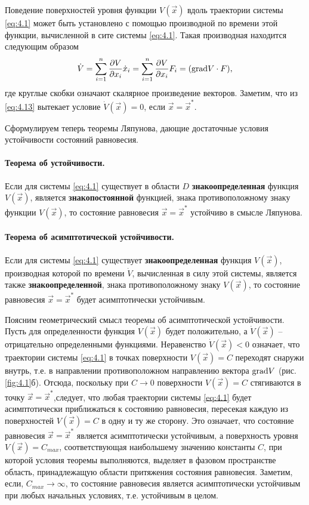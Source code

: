Поведение поверхностей уровня функции $V(\vec x)$ вдоль траектории системы \eqref{eq:4.1} может быть установлено с помощью производной по времени этой функции, вычисленной в сите системы \eqref{eq:4.1}. Такая производная находится следующим образом
\begin{equation}
        \label{eq:4.13}
        \dot V = \sum\limits_{i=1}^{n}  \pdv{V}{x_i} \dot x_{i} = \sum\limits_{i=1}^{n} \pdv{V}{x_{i}} F_i = 
        \qty( \textrm{grad} V \cdot F),
\end{equation}
где круглые скобки означают скалярное произведение векторов. Заметим, что из \eqref{eq:4.13} вытекает условие $\dot V(\vec x)=0$, если $\vec x = \vec x^*$.

Сформулируем теперь теоремы Ляпунова, дающие достаточные условия устойчивости состояний равновесия.

\paragraph{Теорема об устойчивости.}%
\label{par:teorema_ob_ustoichivosti_}

Если для системы \eqref{eq:4.1} существует в области $D$
\textbf{знакоопределенная} функция $V(\vec x)$, является \textbf{знакопостоянной} 
функцией, знака противоположному знаку функции $V(\vec x)$, то состояние равновесия $\vec x = \vec x^*$ устойчиво в смысле Ляпунова.

\paragraph{Теорема об асимптотической устойчивости.}%
\label{par:teorema_ob_asimptoticheskoi_ustoichivosti}

Если для системы \eqref{eq:4.1} существует \textbf{знакоопределенная} функция $V(\vec x)$, производная которой по времени $\dot V$, вычисленная в силу этой системы, является также \textbf{ знакоопределенной}, знака противоположному знаку $V(\vec x)$, то состояние равновесия $\vec x= \vec x^*$ будет асимптотически устойчивым. 

Поясним геометрический смысл теоремы об асимптотической устойчивости. Пусть для определенности функция $V(\vec x)$ будет положительно, а 
$\dot V(\vec x)$ -- отрицательно определенными функциями. Неравенство $\dot V(\vec x)<0$ означает, что траектории системы \eqref{eq:4.1} в точках поверхности $V(\vec x)= C$ переходят снаружи внутрь, т.е. в направлении противоположном направлению вектора $\textrm{grad} V$ (рис.\ref{fig:4.1}б). Отсюда, поскольку при $C \to 0$ поверхности $V(\vec x) = C$ стягиваются в точку $\vec x = \vec x^*$,следует, что любая траектории системы \eqref{eq:4.1} будет асимптотически приближаться к состоянию равновесия, пересекая каждую из поверхностей $V(\vec x) = C$ в одну и ту же сторону.
Это означает, что состояние равновесия $\vec x = \vec x^*$ является асимптотически устойчивым, а поверхность уровня $V(\vec x) = C_{max}$, соответствующая наибольшему значению константы $C$, при которой условия теоремы выполняются, выделяет в фазовом пространстве область, принадлежащую области притяжения состояния равновесия. Заметим, если, $C_{max} \to \infty$, то состояние равновесия является асимптотически устойчивым при любых начальных условиях, т.е. устойчивым в целом.

